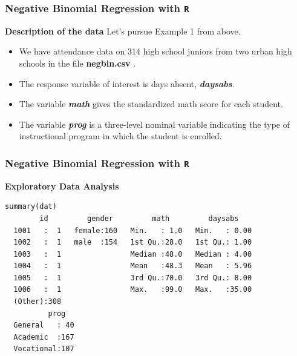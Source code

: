 \documentclass[MASTER.tex]{subfiles}
\begin{document}
\begin{frame}[fragile]
	\frametitle{Negative Binomial Regression with \texttt{R} }
	\Large
	
\textbf{Description of the data}
Let's pursue Example 1 from above.
\begin{itemize}
\item We have attendance data on 314 high school juniors from two urban high schools in the file \textbf{negbin.csv }. 
\item The response variable of interest is days absent, \textbf{\textit{daysabs}}. 
\item The variable \textbf{\textit{math}} gives the standardized math score for each student. 
\item The variable \textbf{\textit{prog}} is a three-level nominal variable indicating the type of instructional program in which the student is enrolled.
\end{itemize}
\end{frame}
	


\begin{frame}[fragile]
\frametitle{Negative Binomial Regression with \texttt{R} }
\normalsize
\textbf{Exploratory Data Analysis}
\begin{framed}
\begin{verbatim}	
summary(dat)
        id         gender         math         daysabs     
  1001   :  1   female:160   Min.   : 1.0   Min.   : 0.00  
  1002   :  1   male  :154   1st Qu.:28.0   1st Qu.: 1.00  
  1003   :  1                Median :48.0   Median : 4.00  
  1004   :  1                Mean   :48.3   Mean   : 5.96  
  1005   :  1                3rd Qu.:70.0   3rd Qu.: 8.00  
  1006   :  1                Max.   :99.0   Max.   :35.00  
  (Other):308                                              
          prog    
  General   : 40  
  Academic  :167  
  Vocational:107  
\end{verbatim}	
\end{framed}

	
               
\end{frame}
\end{document}
